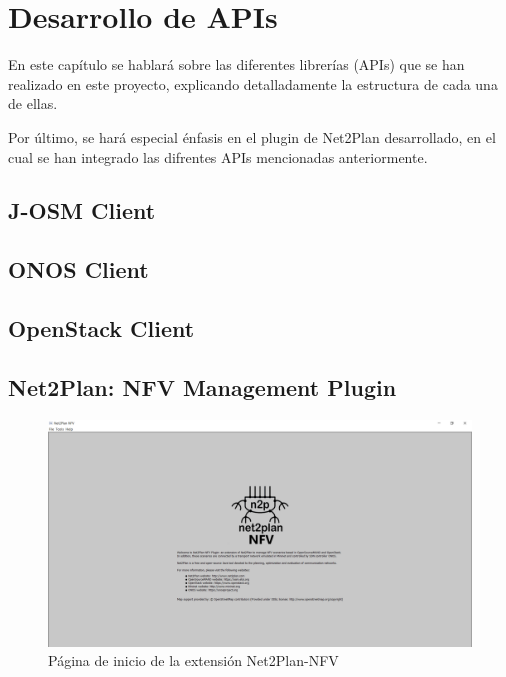 \chapter{Desarrollo de APIs}

En este capítulo se hablará sobre las diferentes librerías (APIs) que se han realizado en este proyecto, explicando detalladamente la estructura de cada una de ellas.

Por último, se hará especial énfasis en el plugin de Net2Plan desarrollado, en el cual se han integrado las difrentes APIs mencionadas anteriormente.


\section{J-OSM Client}
\label{sec:osmclient}

\section{ONOS Client}
\label{sec:onosclient}

\section{OpenStack Client}
\label{sec:openstackclient}

\section{Net2Plan: NFV Management Plugin}
\label{sec:nfvplugin}

\begin{figure}[!ht]
	\centering
	\includegraphics[width=0.8\linewidth]{imagenes/nfvpluginmain}
	\caption{Página de inicio de la extensión Net2Plan-NFV}
	\label{fig:nfvpluginmain}
\end{figure}


